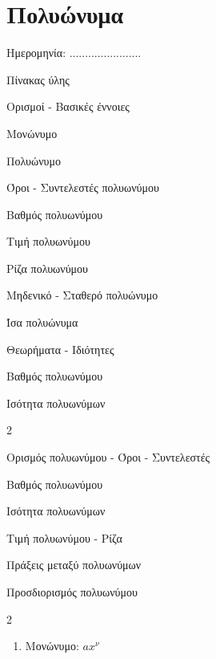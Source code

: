 \documentclass[twoside,nofonts,internet,math,spyros]{frontisthrio}
\newcommand{\myitem}{\stepcounter{enumi}\item[\raisebox{0.5mm}{\faEdit}\ \Large$\square$]}
\begin{document}
\section{Πολυώνυμα}
\begin{flushright}
\faCalendar* Ημερομηνία: .......................
\end{flushright}
\begin{mybox}[mysubtitle]{Πίνακας ύλης}
\begin{tcbraster}[raster columns=2,raster equal height]
\begin{myleftbox}{Ορισμοί - Βασικές έννοιες\ \ \faBook}
\begin{arithmisi}[itemsep=0mm]
\item Μονώνυμο
\item Πολυώνυμο
\item Όροι - Συντελεστές πολυωνύμου
\item Βαθμός πολυωνύμου
\item Τιμή πολυωνύμου
\item Ρίζα πολυωνύμου
\item Μηδενικό - Σταθερό πολυώνυμο
\item Ίσα πολυώνυμα
\end{arithmisi}
\end{myleftbox}
\begin{myrightbox}{Θεωρήματα - Ιδιότητες\ \ \faTools}
\begin{arithmisi}[itemsep=0mm]
\item Βαθμός πολυωνύμου
\item Ισότητα πολυωνύμων
\end{arithmisi}
\end{myrightbox}
\end{tcbraster}
\begin{multicols}{2}
\begin{todolist}[itemsep=0mm]
\myitem Ορισμός πολυωνύμου - Όροι - Συντελεστές
\myitem Βαθμός πολυωνύμου
\item Ισότητα πολυωνύμων
\myitem Τιμή πολυωνύμου - Ρίζα
\item Πράξεις μεταξύ πολυωνύμων
\item Προσδιορισμός πολυωνύμου
\end{todolist}
\end{multicols}
\begin{multicols}{2}
\begin{enumerate}[itemsep=0mm,leftmargin=3mm]
\item Μονώνυμο: $ ax^{\nu} $

\end{enumerate}
\end{multicols}
\end{mybox}
\end{document}
